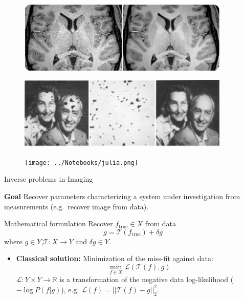 \begin{frame}
\begin{figure}[h!]
\centering
\includegraphics[width=0.9\textwidth]{./Images/denoise.jpg}
\end{figure}
\pause
\begin{figure}[h!]
\centering
\includegraphics[width=0.9\textwidth]{./Images/inpaint.jpg}
\end{figure}
\end{frame}


\begin{frame}
\begin{figure}[h!]
\centering
\texttt{[image: ../Notebooks/julia.png]}
\end{figure}
\end{frame}

\begin{frame}{Inverse problems in Imaging}
\begin{block}{\textbf{Goal}}
Recover parameters characterizing a system under investigation from measurements (e.g.\ recover image from data).
\end{block}
\pause
\bigskip

\begin{block}{Mathematical formulation}
Recover $f_{\text{true}}\in X$ from data
$$
g = \mathcal{T}(f_{\text{true}})+\delta g
$$
where $g\in Y$,$\mathcal{T}:X\longrightarrow Y$ and $\delta g\in Y$.
\end{block}

\pause
\bigskip

\begin{itemize}
\item \textbf{Classical solution:} 
Minimization of the miss-fit against data:
$$
\min_{f\in X}\mathcal{L}(\mathcal{T}(f),g)
$$
$\mathcal{L}:Y\times Y\longrightarrow \mathbb{R}$ is a transformation of the negative data log-likelihood ($-\log P(f|g)$), e.g. $\mathcal{L}(f)=||\mathcal{T}(f)-g||_2^2$.
\end{itemize}
\end{frame}

